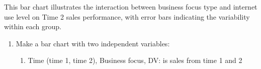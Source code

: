 \documentclass[
]{article}
\providecommand{\tightlist}{%
  \setlength{\itemsep}{0pt}\setlength{\parskip}{0pt}}
\begin{document}
This bar chart illustrates the interaction between business focus type
and internet use level on Time 2 sales performance, with error bars
indicating the variability within each group.

\begin{enumerate}
\def\labelenumi{\arabic{enumi})}
\setcounter{enumi}{2}
\item
  Make a bar chart with two independent variables:

  \begin{enumerate}
  \def\labelenumii{\alph{enumii}.}
  \tightlist
  \item
    Time (time 1, time 2), Business focus, DV: is sales from time 1 and
    2
  \end{enumerate}
\end{enumerate}
\end{document}
